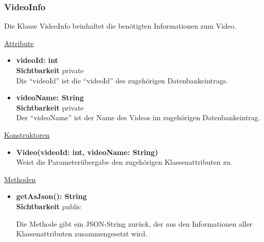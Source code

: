 \subsubsection{VideoInfo}
Die Klasse VideoInfo beinhaltet die benötigten Informationen zum Video. \newline

\underline{Attribute}
\begin{itemize}
\itemsep0pt
\item \textbf{videoId: int} \hfill\\ 
\textbf{Sichtbarkeit} private \hfill\\  

Die ``videoId'' ist die ``videoId'' des zugehörigen Datenbankeintrags.

\item \textbf{videoName: String} \hfill\\ 
\textbf{Sichtbarkeit} private \hfill\\ 

Der ``videoName'' ist der Name des Videos im zugehörigen Datenbankeintrag.

\end{itemize}

\underline{Konstruktoren}
\begin{itemize}
\itemsep0pt
\item \textbf{Video(videoId: int, videoName: String)} \hfill\\

Weist die Parameterübergabe den zugehörigen Klassenattributen zu.

\end{itemize}

\underline{Methoden}
\begin{itemize}
\itemsep0pt
\item \textbf{getAsJson(): String}\hfill\\
\textbf{Sichtbarkeit} public

Die Methode gibt ein JSON-String zurück, der aus den Informationen aller Klassenattributen zusammengesetzt wird.

\end{itemize}